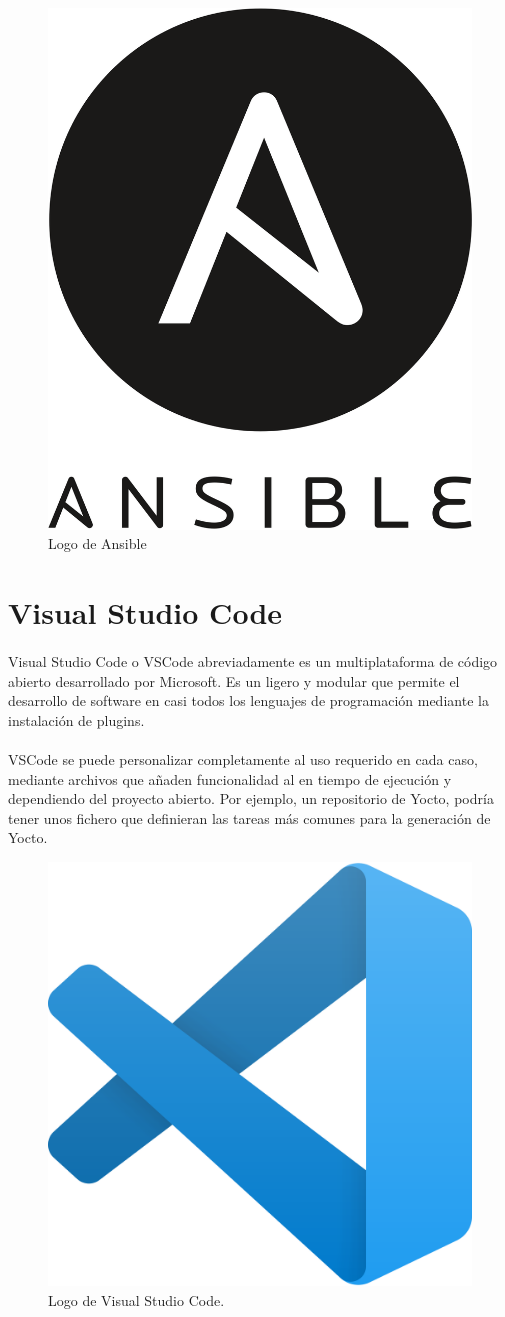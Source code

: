 \begin{figure}[H]
	\centering
	\includegraphics[width=0.30\linewidth]{imgs/ansible-logo}
	\caption[Ansible Logo]{Logo de Ansible}
	\label{fig:ansible}
\end{figure}

\section{Visual Studio Code}\label{sec:vscode}

\paragraph{}Visual Studio Code o VSCode abreviadamente es un  multiplataforma
de código abierto desarrollado por Microsoft. Es un  ligero y modular
que permite el desarrollo de software en casi todos los lenguajes de programación mediante
la instalación de \gls{plugins}.

\paragraph{}VSCode se puede personalizar completamente al uso requerido en cada caso,
mediante archivos que añaden funcionalidad al  en tiempo de ejecución
y dependiendo del proyecto abierto. Por ejemplo, un repositorio de Yocto, podría tener unos
fichero que definieran las tareas más comunes para la generación de Yocto.

\begin{figure}[H]
	\centering
	\includegraphics[width=0.30\linewidth]{imgs/vscode-logo}
	\caption[Visual Studio Code]{Logo de Visual Studio Code.}
	\label{fig:vscode-log}
\end{figure}

